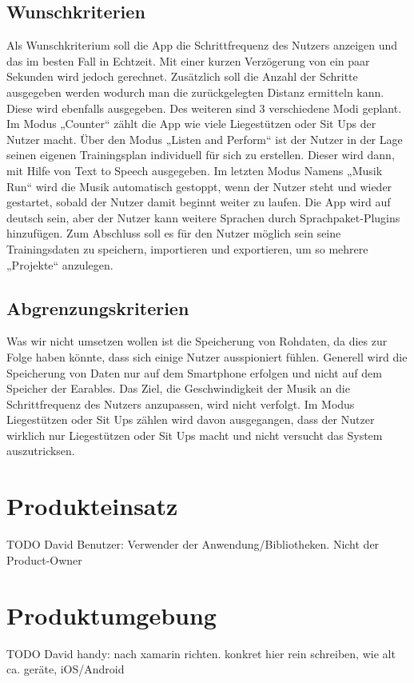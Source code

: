 \documentclass[a4paper,12pt]{article}
\begin{document}
\subsection{Wunschkriterien}
Als Wunschkriterium soll die App die Schrittfrequenz des Nutzers anzeigen und das im besten Fall in Echtzeit. Mit einer kurzen Verzögerung von ein paar Sekunden wird jedoch gerechnet. Zusätzlich soll die Anzahl der Schritte ausgegeben werden wodurch man die zurückgelegten Distanz ermitteln kann. Diese wird ebenfalls ausgegeben. Des weiteren sind 3 verschiedene Modi geplant. Im Modus „Counter“ zählt die App wie viele Liegestützen oder Sit Ups der Nutzer macht. Über den Modus „Listen and Perform“ ist der Nutzer in der Lage seinen eigenen Trainingsplan individuell für sich zu erstellen. Dieser wird dann, mit Hilfe von Text to Speech ausgegeben. Im letzten Modus Namens „Musik Run“ wird die Musik automatisch gestoppt, wenn der Nutzer steht und wieder gestartet, sobald der Nutzer damit beginnt weiter zu laufen. Die App wird auf deutsch sein, aber der Nutzer kann weitere Sprachen durch Sprachpaket-Plugins hinzufügen. Zum Abschluss soll es für den Nutzer möglich sein seine Trainingsdaten zu speichern, importieren und exportieren, um so mehrere „Projekte“ anzulegen.
  \subsection{Abgrenzungskriterien}
Was wir nicht umsetzen wollen ist die Speicherung von Rohdaten, da dies zur Folge haben könnte, dass sich einige Nutzer ausspioniert fühlen. Generell wird die Speicherung von Daten nur auf dem Smartphone erfolgen und nicht auf dem Speicher der Earables. Das Ziel, die Geschwindigkeit der Musik an die Schrittfrequenz des Nutzers anzupassen, wird nicht verfolgt. Im Modus Liegestützen oder Sit Ups zählen wird davon ausgegangen, dass der Nutzer wirklich nur Liegestützen oder Sit Ups macht und nicht versucht das System auszutricksen.


\section{Produkteinsatz}
TODO David 
Benutzer:   Verwender der Anwendung/Bibliotheken. Nicht der Product-Owner

\section{Produktumgebung}
TODO David
handy: nach xamarin richten. konkret hier rein schreiben, wie alt ca. geräte, iOS/Android
\end{document}
